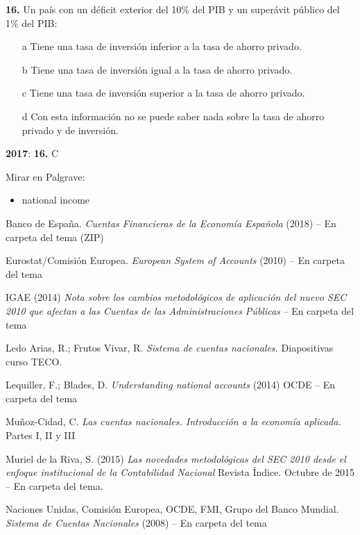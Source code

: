 \documentclass{nuevotema}
\begin{document}
\textbf{16.} Un país con un déficit exterior del 10\% del PIB y un superávit público del 1\% del PIB:

\begin{itemize}
	\item[a] Tiene una tasa de inversión inferior a la tasa de ahorro privado.
	\item[b] Tiene una tasa de inversión igual a la tasa de ahorro privado.
	\item[c] Tiene una tasa de inversión superior a la tasa de ahorro privado.
	\item[d] Con esta información no se puede saber nada sobre la tasa de ahorro privado y de inversión.
\end{itemize}

\notas

\textbf{2017}: \textbf{16.} C


\bibliografia

Mirar en Palgrave:

\begin{itemize}
	\item national income
\end{itemize}

Banco de España. \textit{Cuentas Financieras de la Economía Española} (2018) -- En carpeta del tema (ZIP)

Eurostat/Comisión Europea. \textit{European System of Accounts} (2010) -- En carpeta del tema

IGAE (2014) \textit{Nota sobre los cambios metodológicos de aplicación del nuevo SEC 2010 que afectan a las Cuentas de las Administraciones Públicas} -- En carpeta del tema

Ledo Arias, R.; Frutos Vivar, R. \textit{Sistema de cuentas nacionales.} Diapositivas curso TECO.

Lequiller, F.; Blades, D. \textit{Understanding national accounts} (2014) OCDE -- En carpeta del tema

Muñoz-Cidad, C. \textit{Las cuentas nacionales. Introducción a la economía aplicada.} Partes I, II y III

Muriel de la Riva, S. (2015) \textit{Las novedades metodológicas del SEC 2010 desde el enfoque institucional de la Contabilidad Nacional} Revista Índice. Octubre de 2015 -- En carpeta del tema. 

Naciones Unidas, Comisión Europea, OCDE, FMI, Grupo del Banco Mundial. \textit{Sistema de Cuentas Nacionales} (2008) -- En carpeta del tema
\end{document}
